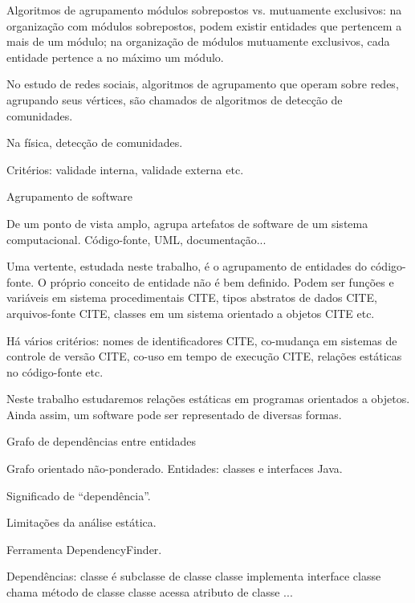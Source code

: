 \begin{itemize}
\begin{section}{Algoritmos de agrupamento}
módulos sobrepostos vs. mutuamente exclusivos: na organização com módulos sobrepostos, podem existir entidades que pertencem a mais de um módulo; na organização de módulos mutuamente exclusivos, cada entidade pertence a no máximo um módulo.


No estudo de redes sociais, algoritmos de agrupamento que operam sobre redes, agrupando seus vértices, são chamados de algoritmos de detecção de comunidades.

Na física, detecção de comunidades.

Critérios: validade interna, validade externa etc.

\end{section}
\begin{section}{Agrupamento de software}

De um ponto de vista amplo, agrupa artefatos de software de um sistema computacional. Código-fonte, UML, documentação...

Uma vertente, estudada neste trabalho, é o agrupamento de entidades do código-fonte. O próprio conceito de entidade não é bem definido. Podem ser funções e variáveis em sistema procedimentais CITE, tipos abstratos de dados CITE, arquivos-fonte CITE, classes em um sistema orientado a objetos CITE etc.

Há vários critérios: nomes de identificadores CITE, co-mudança em sistemas de controle de versão CITE, co-uso em tempo de execução CITE, relações estáticas no código-fonte etc.

Neste trabalho estudaremos relações estáticas em programas orientados a objetos. Ainda assim, um software pode ser representado de diversas formas.

\end{section}
\begin{section}{Grafo de dependências entre entidades}

Grafo orientado não-ponderado.
Entidades: classes e interfaces Java.

Significado de ``dependência''.

Limitações da análise estática.

Ferramenta DependencyFinder.

Dependências:
  classe é subclasse de classe
  classe implementa interface
  classe chama método de classe
  classe acessa atributo de classe
  ...


\end{section}
\end{itemize}
